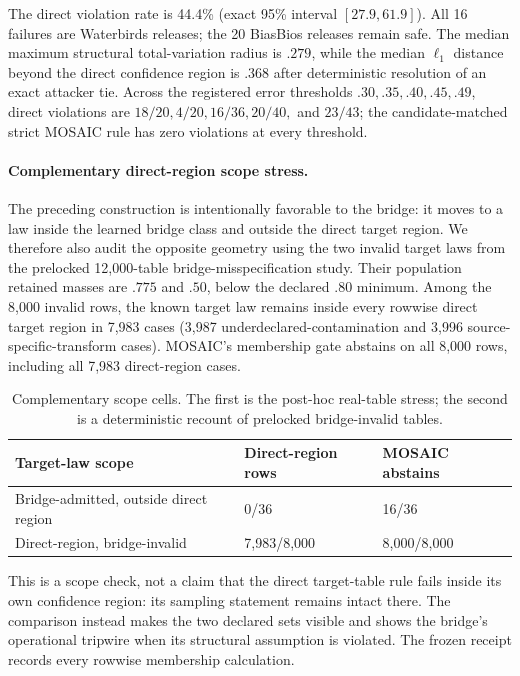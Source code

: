 The direct violation rate is 44.4\% (exact 95\% interval $[27.9,61.9]$).
All 16 failures are Waterbirds releases; the 20 BiasBios releases remain safe.
The median maximum structural total-variation radius is $.279$, while the
median $\ell_1$ distance beyond the direct confidence region is $.368$ after
deterministic resolution of an exact attacker tie. Across
the registered error thresholds $.30,.35,.40,.45,.49$, direct violations are
$18/20,4/20,16/36,20/40,$ and $23/43$; the candidate-matched strict MOSAIC rule
has zero violations at every threshold.

\paragraph{Complementary direct-region scope stress.}
The preceding construction is intentionally favorable to the bridge: it moves
to a law inside the learned bridge class and outside the direct target region.
We therefore also audit the opposite geometry using the two invalid target laws
from the prelocked 12,000-table bridge-misspecification study. Their population
retained masses are $.775$ and $.50$, below the declared $.80$ minimum. Among
the 8,000 invalid rows, the known target law remains inside every rowwise direct
target region in 7,983 cases (3,987 underdeclared-contamination and 3,996
source-specific-transform cases). MOSAIC's membership gate abstains on all
8,000 rows, including all 7,983 direct-region cases.

\begin{table}[t]
\centering
\scriptsize
\setlength{\tabcolsep}{3.2pt}
\begin{tabular}{p{}p{}p{}}
\hline
Target-law scope & Direct-region rows & MOSAIC abstains \\
\hline
Bridge-admitted, outside direct region & 0/36 & 16/36 \\
Direct-region, bridge-invalid & 7,983/8,000 & 8,000/8,000 \\
\hline
\end{tabular}
\caption{Complementary scope cells. The first is the post-hoc real-table
stress; the second is a deterministic recount of prelocked bridge-invalid
tables.}
\label{supp:tab:symmetric-scope}
\end{table}

This is a scope check, not a claim that the direct target-table rule fails
inside its own confidence region: its sampling statement remains intact there.
The comparison instead makes the two declared sets visible and shows the
bridge's operational tripwire when its structural assumption is violated. The
frozen receipt records every rowwise membership calculation.

